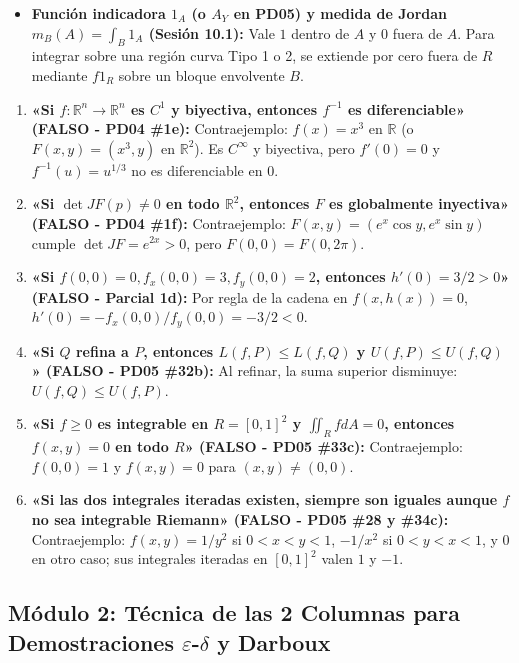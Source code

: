 \documentclass[11pt,a4paper]{article}
\begin{document}
\begin{intuitionbox}
\begin{itemize}[leftmargin=1.5em]
  \item \textbf{Función indicadora $1_A$ (o $A_Y$ en PD05) y medida de Jordan $m_B(A) = \int_B 1_A$ (Sesión 10.1):} Vale $1$ dentro de $A$ y $0$ fuera de $A$. Para integrar sobre una región curva Tipo 1 o 2, se extiende por cero fuera de $R$ mediante $f 1_R$ sobre un bloque envolvente $B$.
\end{itemize}
\end{intuitionbox}

\begin{tcolorbox}[colback=red!3,colframe=red!75!black,arc=1mm,boxrule=0.6pt,title=\textbf{Arsenal de Contraejemplos de Bolsillo para Verdadero / Falso (PC4)}]
\begin{enumerate}[label=\textbf{\arabic*.}, leftmargin=1.5em]
  \item \textbf{«Si $f: \mathbb{R}^n \to \mathbb{R}^n$ es $C^1$ y biyectiva, entonces $f^{-1}$ es diferenciable» (FALSO - PD04 \#1e):} Contraejemplo: $f(x) = x^3$ en $\mathbb{R}$ (o $F(x,y)=(x^3,y)$ en $\mathbb{R}^2$). Es $C^\infty$ y biyectiva, pero $f'(0)=0$ y $f^{-1}(u)=u^{1/3}$ no es diferenciable en $0$.
  \item \textbf{«Si $\det JF(p) \neq 0$ en todo $\mathbb{R}^2$, entonces $F$ es globalmente inyectiva» (FALSO - PD04 \#1f):} Contraejemplo: $F(x,y) = (e^x\cos y, e^x\sin y)$ cumple $\det JF = e^{2x} > 0$, pero $F(0,0) = F(0,2\pi)$.
  \item \textbf{«Si $f(0,0)=0, f_x(0,0)=3, f_y(0,0)=2$, entonces $h'(0) = 3/2 > 0$» (FALSO - Parcial 1d):} Por regla de la cadena en $f(x,h(x))=0$, $h'(0) = -f_x(0,0)/f_y(0,0) = -3/2 < 0$.
  \item \textbf{«Si $Q$ refina a $P$, entonces $L(f,P) \le L(f,Q)$ y $U(f,P) \le U(f,Q)$» (FALSO - PD05 \#32b):} Al refinar, la suma superior disminuye: $U(f,Q) \le U(f,P)$.
  \item \textbf{«Si $f \ge 0$ es integrable en $R=[0,1]^2$ y $\iint_R f dA = 0$, entonces $f(x,y)=0$ en todo $R$» (FALSO - PD05 \#33c):} Contraejemplo: $f(0,0)=1$ y $f(x,y)=0$ para $(x,y)\neq(0,0)$.
  \item \textbf{«Si las dos integrales iteradas existen, siempre son iguales aunque $f$ no sea integrable Riemann» (FALSO - PD05 \#28 y \#34c):} Contraejemplo: $f(x,y) = 1/y^2$ si $0<x<y<1$, $-1/x^2$ si $0<y<x<1$, y $0$ en otro caso; sus integrales iteradas en $[0,1]^2$ valen $1$ y $-1$.
\end{enumerate}
\end{tcolorbox}

\subsection{Módulo 2: Técnica de las 2 Columnas para Demostraciones \texorpdfstring{$\varepsilon$-$\delta$}{epsilon-delta} y Darboux}
\end{document}
